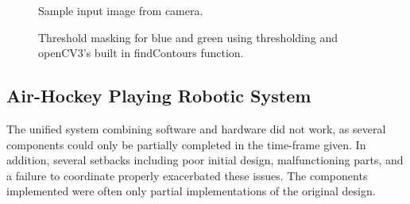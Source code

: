 \documentclass[letterpaper, 12 pt, conference]{ieeeconf}
\begin{document}
\begin{figure}[!h]
\centering
{}
\caption{Sample input image from camera.}
\end{figure}


\begin{figure}
\centering
{}
\caption{Threshold masking for blue and green using thresholding and openCV3’s built in findContours function.}
\end{figure}

\subsection{Air-Hockey Playing Robotic System}
\label{failure}
The unified system combining software and hardware did not work, as several components could only be partially completed in the time-frame given. In addition, several setbacks including poor initial design, malfunctioning parts, and a failure to coordinate properly exacerbated these issues. The components implemented were often only partial implementations of the original design.
\end{document}

